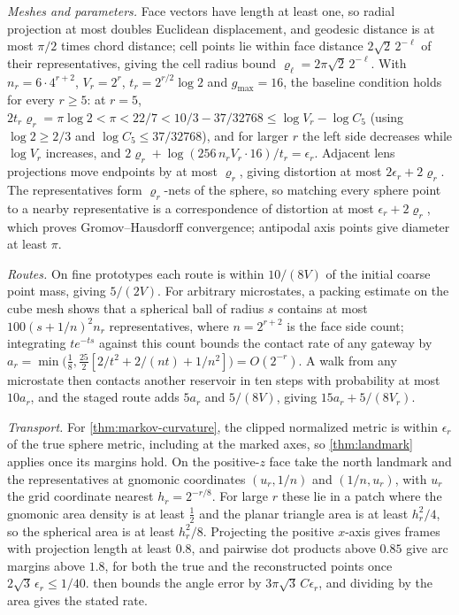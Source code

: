 \emph{Meshes and parameters.}
Face vectors have length at least one, so radial projection at most doubles Euclidean displacement, and geodesic distance is at most $\pi/2$ times chord distance; cell points lie within face distance $2\sqrt2\,2^{-\ell}$ of their representatives, giving the cell radius bound $\varrho_\ell=2\pi\sqrt2\,2^{-\ell}$.
With $n_r=6\cdot4^{r+2}$, $V_r=2^r$, $t_r=2^{r/2}\log2$ and $g_{\max}=16$, the baseline condition holds for every $r\ge5$: at $r=5$, $2t_r\varrho_r=\pi\log2<\pi<22/7<10/3-37/32768\le\log V_r-\log C_5$ (using $\log2\ge2/3$ and $\log C_5\le37/32768$), and for larger $r$ the left side decreases while $\log V_r$ increases, and $2\varrho_r+\log(256\,n_rV_r\cdot16)/t_r=\epsilon_r$.
Adjacent lens projections move endpoints by at most $\varrho_r$, giving distortion at most $2\epsilon_r+2\varrho_r$.
The representatives form $\varrho_r$-nets of the sphere, so matching every sphere point to a nearby representative is a correspondence of distortion at most $\epsilon_r+2\varrho_r$, which proves Gromov--Hausdorff convergence; antipodal axis points give diameter at least $\pi$.

\emph{Routes.}
On fine prototypes each route is within $10/(8V)$ of the initial coarse point mass, giving $5/(2V)$.
For arbitrary microstates, a packing estimate on the cube mesh shows that a spherical ball of radius $s$ contains at most $100(s+1/n)^2n_r$ representatives, where $n=2^{r+2}$ is the face side count; integrating $te^{-ts}$ against this count bounds the contact rate of any gateway by $a_r=\min\bigl(\tfrac18,\tfrac{25}2[2/t^2+2/(nt)+1/n^2]\bigr)=O(2^{-r})$.
A walk from any microstate then contacts another reservoir in ten steps with probability at most $10a_r$, and the staged route adds $5a_r$ and $5/(8V)$, giving $15a_r+5/(8V_r)$.

\emph{Transport.}
For \cref{thm:markov-curvature}, the clipped normalized metric is within $\epsilon_r$ of the true sphere metric, including at the marked axes, so \cref{thm:landmark} applies once its margins hold.
On the positive-$z$ face take the north landmark and the representatives at gnomonic coordinates $(u_r,1/n)$ and $(1/n,u_r)$, with $u_r$ the grid coordinate nearest $h_r=2^{-r/8}$.
For large $r$ these lie in a patch where the gnomonic area density is at least $\tfrac12$ and the planar triangle area is at least $h_r^2/4$, so the spherical area is at least $h_r^2/8$.
Projecting the positive $x$-axis gives frames with projection length at least $0.8$, and pairwise dot products above $0.85$ give arc margins above $1.8$, for both the true and the reconstructed points once $2\sqrt3\,\epsilon_r\le1/40$.
 then bounds the angle error by $3\pi\sqrt3\,C\epsilon_r$, and dividing by the area gives the stated rate.

